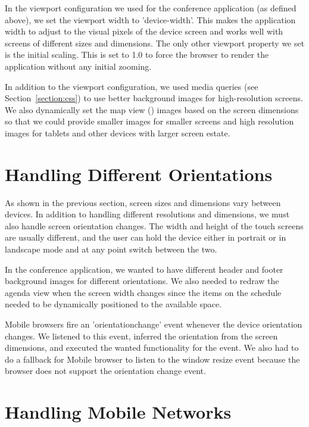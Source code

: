 In the viewport configuration we used for the conference application
(as defined above), we set the viewport width to 'device-width'. This
makes the application width to adjust to the visual pixels of the
device screen and works well with screens of different sizes and
dimensions. The only other viewport property we set is the initial
scaling. This is set to 1.0 to force the browser to render the
application without any initial zooming.

In addition to the viewport configuration, we used media queries (see
Section~\ref{section:css}) to use better background images for
high-resolution screens. We also dynamically set the map view
() images based on the screen dimensions so
that we could provide smaller images for smaller screens and high
resolution images for tablets and other devices with larger screen
estate.

\section{Handling Different Orientations}

As shown in the previous section, screen sizes and dimensions vary
between devices. In addition to handling different resolutions and
dimensions, we must also handle screen orientation changes. The width
and height of the touch screens are usually different, and the user
can hold the device either in portrait or in landscape mode and at any
point switch between the two.

In the conference application, we wanted to have different header and
footer background images for different orientations. We also needed to
redraw the agenda view when the screen width changes since the items
on the schedule needed to be dynamically positioned to the available
space.

Mobile browsers fire an 'orientationchange' event whenever the device
orientation changes. We listened to this event, inferred the
orientation from the screen dimensions, and executed the wanted
functionality for the event. We also had to do a fallback for Mobile
 browser to listen to the window resize event because the
browser does not support the orientation change event.

\section{Handling Mobile Networks}
\label{section:handling-networks}

